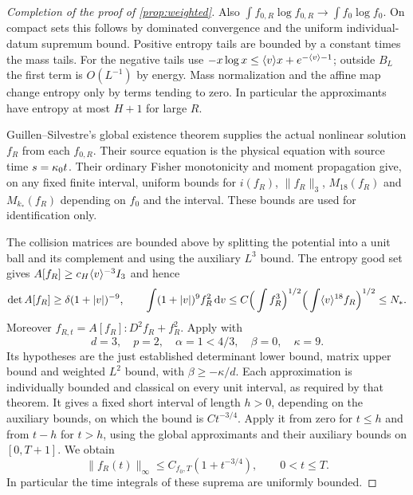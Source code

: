 \begin{proof}[Completion of the proof of \cref{prop:weighted}]
Also $\int f_{0,R}\log f_{0,R}\to\int f_0\log f_0$. On compact sets this follows by dominated convergence and the uniform individual-datum supremum bound. Positive entropy tails are bounded by a constant times the mass tails. For the negative tails use
$-x\log x\le\langle v\rangle x+e^{-\langle v\rangle-1}$; outside $B_L$ the first term is $O(L^{-1})$ by energy. Mass normalization and the affine map change entropy only by terms tending to zero. In particular the approximants have entropy at most $H+1$ for large $R$.

Guillen--Silvestre's global existence theorem \cite[Theorem~1.2]{GS} supplies the actual nonlinear solution $f_R$ from each $f_{0,R}$. Their source equation is the physical equation with source time $s=\kappa_0 t$. Their ordinary Fisher monotonicity and moment propagation \cite[Theorems~1.1 and~2.4]{GS} give, on any fixed finite interval, uniform bounds for $i(f_R)$, $\|f_R\|_3$, $M_{18}(f_R)$ and $M_{k_*}(f_R)$ depending on $f_0$ and the interval. These bounds are used for identification only.

The collision matrices are bounded above by splitting the potential into a unit ball and its complement and using the auxiliary $L^3$ bound. The entropy good set gives $A[f_R]\ge c_H\langle v\rangle^{-3}I_3$ and hence
\[
 \det A[f_R]\ge\delta(1+|v|)^{-9},\qquad
 \int(1+|v|)^9f_R^2\,\mathrm dv
 \le C\Big(\int f_R^3\Big)^{1/2}
       \Big(\int\langle v\rangle^{18}f_R\Big)^{1/2}\le N_*.
\]
Moreover $f_{R,t}=A[f_R]:D^2f_R+f_R^2$. Apply \cite[Theorem~2.1]{Silvestre} with
\[
 d=3,\quad p=2,\quad\alpha=1<4/3,\quad\beta=0,\quad\kappa=9.
\]
Its hypotheses are the just established determinant lower bound, matrix upper bound and weighted $L^2$ bound, with $\beta\ge-\kappa/d$. Each approximation is individually bounded and classical on every unit interval, as required by that theorem. It gives a fixed short interval of length $h>0$, depending on the auxiliary bounds, on which the bound is $Ct^{-3/4}$. Apply it from zero for $t\le h$ and from $t-h$ for $t>h$, using the global approximants and their auxiliary bounds on $[0,T+1]$. We obtain
\begin{equation}\label{eq:approx-sup}
 \|f_R(t)\|_\infty\le C_{f_0,T}(1+t^{-3/4}),\qquad0<t\le T.
\end{equation}
In particular the time integrals of these suprema are uniformly bounded.


\end{proof}
